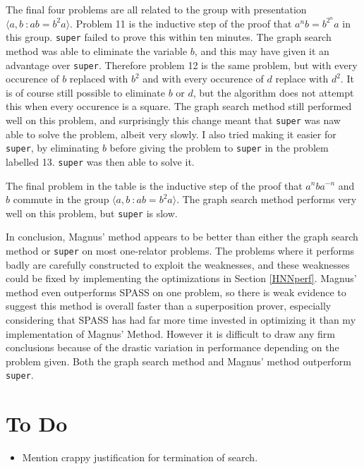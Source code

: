 \documentclass[12pt]{article} %
\theoremstyle{definition}
\theoremstyle{definition}
\theoremstyle{definition}
\theoremstyle{definition}
\theoremstyle{definition}
\theoremstyle{definition}
\begin{document}
The final four problems are all related to the group with presentation
$\langle a, b \ : ab = b^2a\rangle$. Problem 11 is the inductive step
of the proof that $a^nb = b^{2^n}a$ in this group. \lstinline{super} failed to prove this
within ten minutes. The graph search method was able to eliminate the variable
$b$, and this may have given it an advantage over \lstinline{super}. Therefore problem 12
is the same problem, but with every occurence of $b$ replaced with $b^2$ and
with every occurence of $d$ replace with $d^2$. It is of course still possible
to eliminate $b$ or $d$, but the algorithm does not attempt this when every occurence
is a square. The graph search method still performed well on this problem, and
surprisingly this change meant that \lstinline{super} was naw able to solve the problem, albeit
very slowly. I also tried making it easier for \lstinline{super}, by eliminating $b$ before giving the problem
to \lstinline{super} in the problem labelled 13. \lstinline{super} was then able to solve it.

The final problem in the table is the inductive step of the proof that
$a^nba^{-n}$ and $b$ commute in the group $\langle a, b \ : ab = b^2a\rangle$.
The graph search method performs very well on this problem, but \lstinline{super} is slow.

In conclusion, Magnus' method appears to be better than either the graph search method
or \lstinline{super} on most one-relator problems. The problems where it performs badly are
carefully constructed to exploit the weaknesses, and these weaknesses could be fixed
by implementing the optimizations in Section \ref{HNNperf}. Magnus' method even
outperforms SPASS on one problem, so there is weak evidence to suggest this method
is overall faster than a superposition prover, especially considering that SPASS
has had far more time invested in optimizing it than my implementation of Magnus'
Method. However it is difficult to draw any firm conclusions because of the drastic variation
in performance depending on the problem given. Both the graph
search method and Magnus' method outperform \lstinline{super}.

\section{To Do}
\begin{itemize}
  \item Mention crappy justification for termination of search.
\end{itemize}


\end{document}
